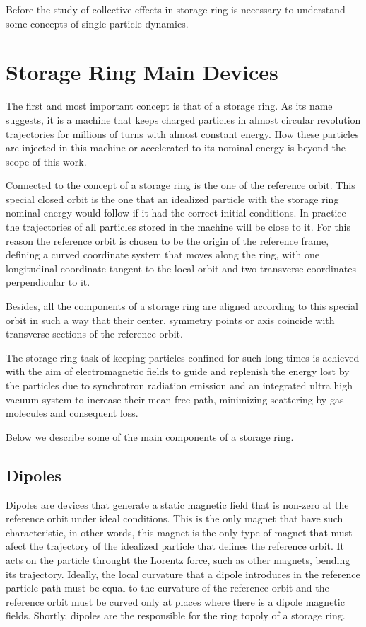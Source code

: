     Before the study of collective effects in storage ring is necessary to understand some concepts of single particle dynamics.

\section{Storage Ring Main Devices} \label{ssec:storage_ring_main_devices}

    The first and most important concept is that of a storage ring. As its name suggests, it is a machine that keeps charged particles in almost circular revolution trajectories for millions of turns with almost constant energy. How these particles are injected in this machine or accelerated to its nominal energy is beyond the scope of this work.

    Connected to the concept of a storage ring is the one of the reference orbit. This special closed orbit is the one that an idealized particle with the storage ring nominal energy would follow if it had the correct initial conditions. In practice the trajectories of all particles stored in the machine will be close to it. For this reason the reference orbit is chosen to be the origin of the reference frame, defining a curved coordinate system that moves along the ring, with one longitudinal coordinate tangent to the local orbit and two transverse coordinates perpendicular to it.

    Besides, all the components of a storage ring are aligned according to this special orbit in such a way that their center, symmetry points or axis coincide with transverse sections of the reference orbit.

    The storage ring task of keeping particles confined for such long times is achieved with the aim of electromagnetic fields to guide and replenish the energy lost by the particles due to synchrotron radiation emission and an integrated ultra high vacuum system to increase their mean free path, minimizing scattering by gas molecules and consequent loss.

    Below we describe some of the main components of a storage ring.

\subsection{Dipoles}

    Dipoles are devices that generate a static magnetic field that is non-zero at the reference orbit under ideal conditions. This is the only magnet that have such characteristic, in other words, this magnet is the only type of magnet that must afect the trajectory of the idealized particle that defines the reference orbit. It acts on the particle throught the Lorentz force, such as other magnets, bending its trajectory. Ideally, the local curvature that a dipole introduces in the reference particle path must be equal to the curvature of the reference orbit and the reference orbit must be curved only at places where there is a dipole magnetic fields. Shortly, dipoles are the responsible for the ring topoly of a storage ring.


